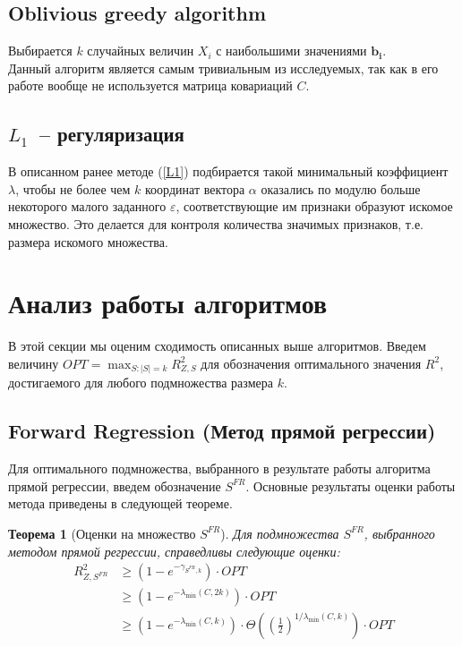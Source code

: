 \documentclass[preprint,12pt]{elsarticle}
\newtheorem{theorem}{Теорема}
\begin{document}
\subsection{Oblivious greedy algorithm}
Выбирается $k$ случайных величин $X_i$ с наибольшими значениями $\mathbf{b_i}$.\\

Данный алгоритм является самым тривиальным из исследуемых, так как в его работе вообще не используется матрица ковариаций $C$.

\subsection{$L_1$~-- регуляризация}
В описанном ранее методе (\ref{L1}) подбирается такой минимальный коэффициент $\lambda$, чтобы не более чем $k$ координат вектора $\alpha$ оказались по модулю больше некоторого малого заданного $\varepsilon$, соответствующие им признаки образуют искомое множество. Это делается для контроля количества значимых признаков, т.е. размера искомого множества.

\section{Анализ работы алгоритмов}
В этой секции мы оценим сходимость описанных выше алгоритмов. Введем величину $OPT=\max_{S:|S|=k} R_{Z, S}^{2}$ для обозначения оптимального значения $R^2$, достигаемого для любого подмножества размера $k$. 
\subsection{Forward Regression (Метод прямой регрессии)}
Для оптимального подмножества, выбранного в результате работы алгоритма прямой регрессии, введем обозначение $S^{FR}$. Основные результаты оценки работы метода приведены в следующей теореме.
\begin{theorem}[Оценки на множество $S^{FR}$\cite{das2011submodular}]
Для подмножества $S^{FR}$, выбранного методом прямой регрессии, справедливы следующие оценки:
\begin{equation}\begin{aligned}
R_{Z, S^{F R}}^{2} & \geq\left(1-e^{-\gamma_{S^{F R}, k}}\right) \cdot OPT \\
& \geq\left(1-e^{-\lambda_{\min }(C, 2 k)}\right) \cdot OPT \\
& \geq\left(1-e^{-\lambda_{\min }(C, k)}\right) \cdot \Theta\left(\left(\frac{1}{2}\right)^{1 / \lambda_{\min }(C, k)}\right) \cdot OPT
\end{aligned}\end{equation}
\end{theorem}
\end{document}
